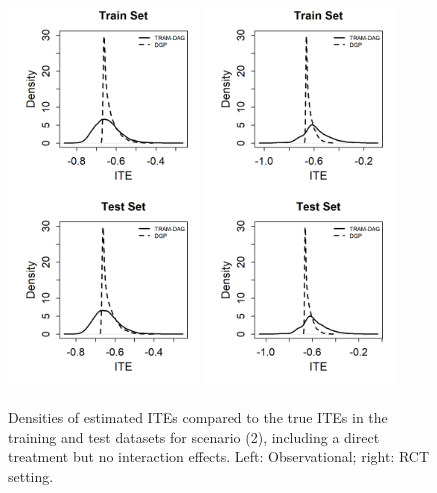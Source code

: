 \begin{figure}[htbp]
\centering
\includegraphics[width=0.45\textwidth]{img/results/observ_scenario2_ITE_densities_train_test.png}
\includegraphics[width=0.45\textwidth]{img/results/rct_scenario2_ITE_densities_train_test.png}
\caption{Densities of estimated ITEs compared to the true ITEs in the training and test datasets for scenario (2), including a direct treatment but no interaction effects. Left: Observational; right: RCT setting.}
\label{fig:scenario2_ite_densities_train_test}
\end{figure}






